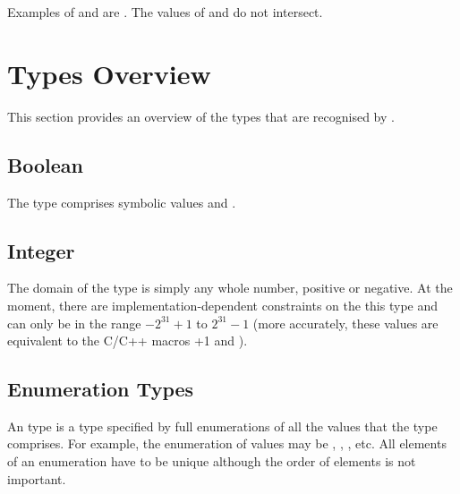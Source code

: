 Examples of  and 
are . 
%
The values of  and  do not intersect.



\section{Types Overview}
\label{Types}

This section provides an overview of the types that are recognised by
\nusmv.

\subsection{Boolean}
\label{Boolean Type}

The \Boolean type comprises symbolic values  and
.

\subsection{Integer}
\label{Integer Type}

%

The domain of the \Integer type is simply any whole number, positive
or negative.
%
At the moment, there are implementation-dependent constraints on the
this type and  can only be in the range
$-2^{31}+1$ to $2^{31}-1$ (more accurately, these values are
equivalent to the C/C++ macros +1 and ).

\subsection{Enumeration Types}
\label{Enumeration Types}

An \Enum type is a type specified by full enumerations of all the values
that the type comprises.  For example, the enumeration of values may be
, , , etc.  All elements of an enumeration have
to be unique although the order of elements is not important.

